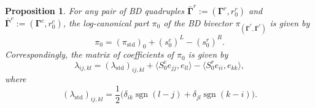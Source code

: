 \documentclass[11pt]{article}
\newcommand{\bbg}{\bar{\mathbf{\Gamma}}}
\newcommand{\bg}{\mathbf{\Gamma}}
\newcommand{\std}{\mathrm{std}}
\DeclareMathOperator{\sgn}{sgn}
\newtheorem{proposition}[theorem]{Proposition}%
\theoremstyle{definition}\newtheorem{definition}[theorem]{Definition}
\theoremstyle{definition}\newtheorem{remark}[theorem]{Remark}
\theoremstyle{remark}
\numberwithin{equation}{section}
\begin{document}
\begin{proposition}\label{p:log-part}
    For any pair of BD quadruples $\bbg^r:=(\bg^r,r_0^r)$ and $\bbg^c := (\bg^c,r_0^c)$, the log-canonical part $\pi_0$ of the BD bivector $\pi_{(\bbg^r,\bbg^c)}$ is given by
    \begin{equation*}
        \pi_0 = (\pi_{\std})_0 + (s_0^c)^L - (s_0^r)^R.
    \end{equation*}
    Correspondingly, the matrix of coefficients of $\pi_0$ is given by
    \begin{equation*}
        \lambda_{ij,kl} = (\lambda_{\std})_{ij,kl} + \langle S_0^c e_{jj}, e_{ll}\rangle - \langle S_0^r e_{ii},e_{kk}\rangle,
    \end{equation*}
    where
    \begin{equation*}
        (\lambda_{\std})_{ij,kl} = \frac{1}{2}\big(\delta_{ik}\sgn(l-j) + \delta_{jl}\sgn(k-i)\big).
    \end{equation*}
\end{proposition}
\end{document}
